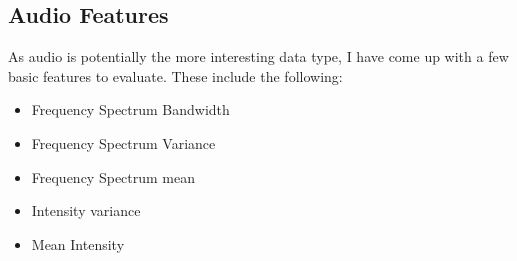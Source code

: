 \documentclass[journal]{IEEEtran}
\begin{document}
\subsection{Audio Features}
As audio is potentially the more interesting data type, I have come up with a few basic features to evaluate. These include the following:
\begin{itemize}
\item Frequency Spectrum Bandwidth
\item Frequency Spectrum Variance
\item Frequency Spectrum mean
\item Intensity variance
\item Mean Intensity
\end{itemize}


%
%
%


\raggedbottom
\end{document}
